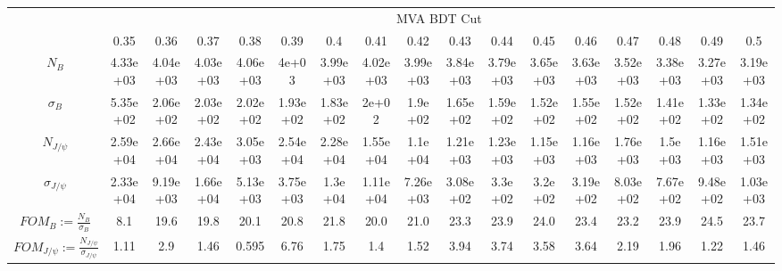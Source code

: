 \begin{table}[!h]
\centering
\begin{adjustbox}{width=18cm, rotate=90}
\centering
\begin{tabular}{*{1}{c|}*{16}{c}}
& \multicolumn{16}{c}{MVA BDT Cut}\\
& 0.35& 0.36& 0.37& 0.38& 0.39& 0.4& 0.41& 0.42& 0.43& 0.44& 0.45& 0.46& 0.47& 0.48& 0.49& 0.5\\ \hline
$N_B$& 4.33e+03& 4.04e+03& 4.03e+03& 4.06e+03& 4e+03& 3.99e+03& 4.02e+03& 3.99e+03& 3.84e+03& 3.79e+03& 3.65e+03& 3.63e+03& 3.52e+03& 3.38e+03& 3.27e+03& 3.19e+03\\
$\sigma_B$& 5.35e+02& 2.06e+02& 2.03e+02& 2.02e+02& 1.93e+02& 1.83e+02& 2e+02& 1.9e+02& 1.65e+02& 1.59e+02& 1.52e+02& 1.55e+02& 1.52e+02& 1.41e+02& 1.33e+02& 1.34e+02\\
$N_{J/\psi}$& 2.59e+04& 2.66e+04& 2.43e+04& 3.05e+03& 2.54e+04& 2.28e+04& 1.55e+04& 1.1e+04& 1.21e+03& 1.23e+03& 1.15e+03& 1.16e+03& 1.76e+03& 1.5e+03& 1.16e+03& 1.51e+03\\
$\sigma_{J/\psi}$& 2.33e+04& 9.19e+03& 1.66e+04& 5.13e+03& 3.75e+03& 1.3e+04& 1.11e+04& 7.26e+03& 3.08e+02& 3.3e+02& 3.2e+02& 3.19e+02& 8.03e+02& 7.67e+02& 9.48e+02& 1.03e+03\\ \hline
$FOM_{B}:=\frac{N_B}{\sigma_B}$& 8.1& 19.6& 19.8& 20.1& 20.8& 21.8& 20.0& 21.0& 23.3& 23.9& 24.0& 23.4& 23.2& 23.9& 24.5& 23.7\\
$FOM_{J/\psi}:=\frac{N_{J/\psi}}{\sigma_{J/\psi}}$& 1.11& 2.9& 1.46& 0.595& 6.76& 1.75& 1.4& 1.52& 3.94& 3.74& 3.58& 3.64& 2.19& 1.96& 1.22& 1.46\\ \hline
\end{tabular}
\end{adjustbox}
\end{table}
